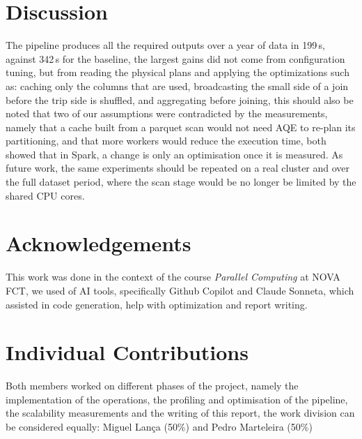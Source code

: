 \documentclass[sigconf]{acmart}
\begin{document}


\section{Discussion}
\label{sec:conclusion}

The pipeline produces all the required outputs over a year of data in 199\,s, against 342\,s for
the baseline, the largest gains did not come from configuration tuning, but from reading the
physical plans and applying the optimizations such as:
caching only the columns that are used, broadcasting the small side of a join
before the trip side is shuffled, and aggregating before joining, this should also be noted that
two of our assumptions were contradicted by the measurements, namely that a cache built from a
parquet scan would not need AQE to re-plan its partitioning, and that more workers would reduce
the execution time, both showed that in Spark, a change is only an optimisation once it is
measured. 
As future work, the same experiments should be repeated on a real cluster and over the
full dataset period, where the scan stage would be no longer be limited by the shared CPU cores.

\clearpage




\section*{Acknowledgements}
This work was done in the context of the course \emph{Parallel Computing} 
at NOVA FCT, we used of AI tools, specifically Github Copilot and Claude Sonneta, 
which assisted in code generation, help with optimization and report writing.

\section*{Individual Contributions}

Both members worked on different phases of the project, namely the implementation of the
operations, the profiling and optimisation of the pipeline, the scalability measurements and the
writing of this report, the work division can be considered equally:
Miguel Lan\c{c}a (50\%) and Pedro Marteleira (50\%)
\end{document}
